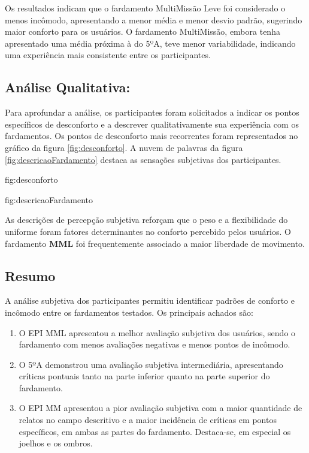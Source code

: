         Os resultados indicam que o fardamento MultiMissão Leve foi considerado o menos incômodo, 
        apresentando a menor média e menor desvio padrão, sugerindo maior conforto para os usuários. 
        O fardamento MultiMissão, embora tenha apresentado uma média próxima à do 5ºA, teve menor 
        variabilidade, indicando uma experiência mais consistente entre os participantes.
            


 
    \subsection{ Análise Qualitativa:}
        Para aprofundar a análise, os participantes foram solicitados a indicar os pontos específicos 
        de desconforto e a descrever qualitativamente sua experiência com os fardamentos. Os pontos 
        de desconforto mais recorrentes foram representados no gráfico da figura \ref{fig:desconforto}. 
        A nuvem de palavras da figura \ref{fig:descricaoFardamento} destaca as sensações subjetivas 
        dos participantes. 
        
        {fig:desconforto}

        {fig:descricaoFardamento}

        As descrições de percepção subjetiva reforçam que o peso e a flexibilidade do uniforme foram 
        fatores determinantes no conforto percebido pelos usuários. O fardamento \textbf{\acrlong{MML}} foi 
        frequentemente associado a maior liberdade de movimento.
    \subsection{Resumo}
    A análise subjetiva dos participantes permitiu identificar padrões de conforto e incômodo entre 
    os fardamentos testados. Os principais achados são:

    \begin{enumerate}[label=\Roman*.] %
        \item O \acrshort{EPI} \acrlong{MML} apresentou a melhor avaliação subjetiva dos usuários, 
        sendo o fardamento com menos avaliações negativas e menos pontos de incômodo.
        \item O 5ºA demonstrou uma avaliação subjetiva intermediária, apresentando críticas 
        pontuais tanto na parte inferior quanto na parte superior do fardamento.
        \item O \acrshort{EPI} \acrlong{MM} apresentou a pior avaliação subjetiva 
        com a maior quantidade de relatos no campo descritivo e a maior incidência de críticas em 
        pontos específicos, em ambas as partes do fardamento. Destaca-se, em especial os joelhos 
        e os ombros.
        \end{enumerate}
